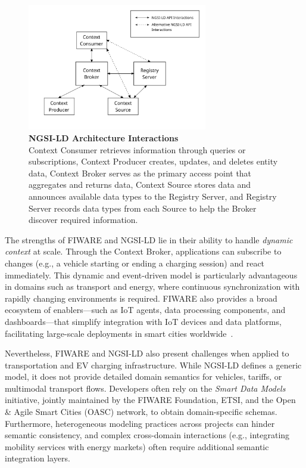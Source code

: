 \begin{figure}[ht]
    \centering
    \includegraphics[width=0.7\textwidth]{Images/NGSI-LD-Architecture-Interactions.svg.png}
    \caption{\textbf{NGSI-LD Architecture Interactions} \\
    Context Consumer retrieves information through queries or subscriptions, Context Producer creates, updates, and deletes entity data, Context Broker serves as the primary access point that aggregates and returns data, Context Source stores data and announces available data types to the Registry Server, and Registry Server records data types from each Source to help the Broker discover required information.}
    \label{fig:orion}
\end{figure}

The strengths of FIWARE and NGSI-LD lie in their ability to handle
\emph{dynamic context} at scale. Through the Context Broker,
applications can subscribe to changes (e.g., a vehicle starting or
ending a charging session) and react immediately. This dynamic and
event-driven model is particularly advantageous in domains such as
transport and energy, where continuous synchronization with rapidly
changing environments is required. FIWARE also provides a broad
ecosystem of enablers—such as IoT agents, data processing
components, and dashboards—that simplify integration with IoT
devices and data platforms, facilitating large-scale deployments in
smart cities worldwide~\cite{Papadakis2022NGSI}.

Nevertheless, FIWARE and NGSI-LD also present challenges when
applied to transportation and EV charging infrastructure. While
NGSI-LD defines a generic model, it does not provide detailed domain
semantics for vehicles, tariffs, or multimodal transport flows. Developers
often rely on the \emph{Smart Data Models} initiative, jointly maintained
by the FIWARE Foundation, ETSI, and the Open \& Agile Smart Cities
(OASC) network, to obtain domain-specific schemas. Furthermore,
heterogeneous modeling practices across projects can hinder semantic
consistency, and complex cross-domain interactions (e.g., integrating
mobility services with energy markets) often require additional semantic
integration layers. 

